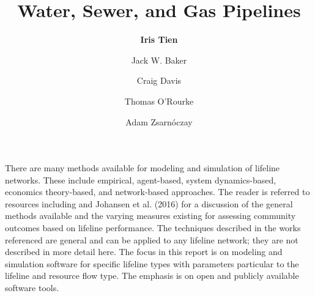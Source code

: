 %
%
%


%
%
%
%
%
%
%
%

\title{Water, Sewer, and Gas Pipelines}
\author{
    \textbf{Iris Tien}
    \and {Jack W. Baker}
    \and {Craig Davis}
    \and {Thomas O'Rourke}
    \and {Adam Zsarnóczay}}
\tocauthor{}
%
%
\maketitle

There are many methods available for modeling and simulation of lifeline networks. These include empirical, agent-based, system dynamics-based, economics theory-based, and network-based approaches. The reader is referred to resources including \cite{ouyang2014review} and Johansen et al. (2016) for a discussion of the general methods available and the varying measures existing for assessing community outcomes based on lifeline performance. The techniques described in the works referenced are general and can be applied to any lifeline network; they are not described in more detail here. The focus in this report is on modeling and simulation software for specific lifeline types with parameters particular to the lifeline and resource flow type. The emphasis is on open and publicly available software tools.

